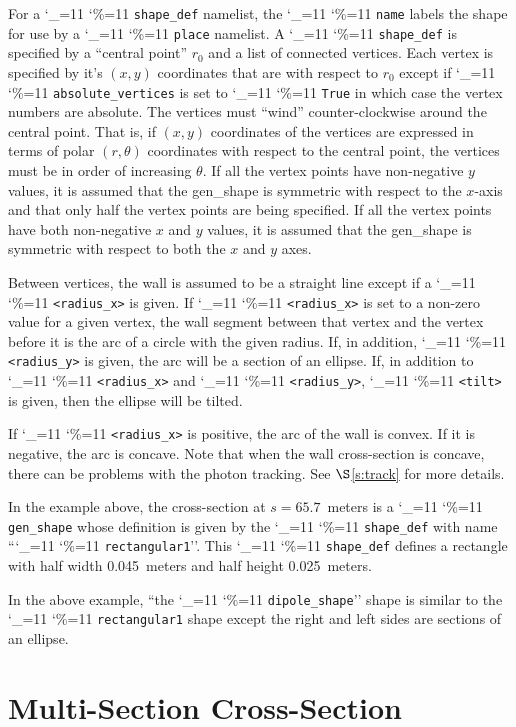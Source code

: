 \documentclass[11pt,openany]{report}
\newcommand{\sref}[1]{$\S$\ref{#1}}
\newcommand\ttcmd{\begingroup\catcode`\_=11 \catcode`\%=11 \dottcmd}
\newcommand\dottcmd[1]{\texttt{#1}\endgroup}
\newcommand{\vn}{\ttcmd}
\begin{document}
For a \vn{shape_def} namelist, the \vn{name} labels the shape for use
by a \vn{place} namelist.  A \vn{shape_def} is specified by a
``central point'' $r_0$ and a list of connected vertices. Each vertex
is specified by it's $(x, y)$ coordinates that are with respect to
$r_0$ except if \vn{absolute_vertices} is set to \vn{True} in which
case the vertex numbers are absolute. The vertices must ``wind''
counter-clockwise around the central point. That is, if $(x, y)$
coordinates of the vertices are expressed in terms of polar $(r,
\theta)$ coordinates with respect to the central point, the vertices
must be in order of increasing $\theta$. If all the vertex points have
non-negative $y$ values, it is assumed that the gen_shape is symmetric
with respect to the $x$-axis and that only half the vertex points are
being specified. If all the vertex points have both non-negative $x$
and $y$ values, it is assumed that the gen_shape is symmetric with
respect to both the $x$ and $y$ axes.

Between vertices, the wall is assumed to be a straight line except if
a \vn{<radius_x>} is given. If \vn{<radius_x>} is set to a non-zero
value for a given vertex, the wall segment between that vertex and the
vertex before it is the arc of a circle with the given radius. If, in
addition, \vn{<radius_y>} is given, the arc will be a section of an
ellipse.  If, in addition to \vn{<radius_x>} and \vn{<radius_y>},
\vn{<tilt>} is given, then the ellipse will be tilted.

If \vn{<radius_x>} is positive, the arc of the wall is convex. If it
is negative, the arc is concave. Note that when the wall cross-section
is concave, there can be problems with the photon tracking. See
\sref{s:track} for more details.

In the example above, the cross-section at $s = 65.7$~meters is a
\vn{gen_shape} whose definition is given by the \vn{shape_def}
with name ``\vn{rectangular1}''.  This \vn{shape_def} defines a rectangle
with half width 0.045~meters and half height 0.025~meters.

In the above example, ``the \vn{dipole_shape}'' shape is similar to
the \vn{rectangular1} shape except the right and left sides are
sections of an ellipse.

\section{Multi-Section Cross-Section}
\label{s:multi.sec}
\end{document}
